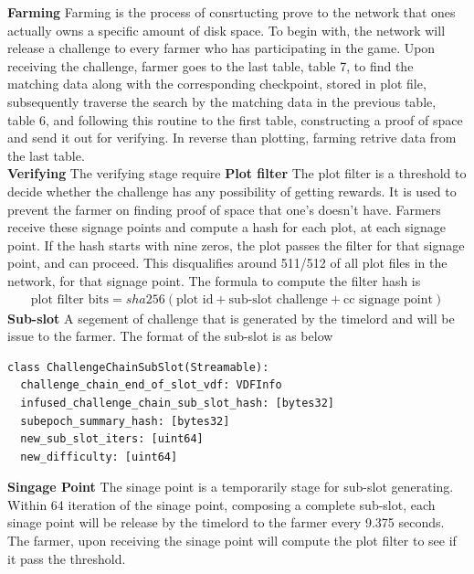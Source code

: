 \documentclass[sigconf, nonacm, natbib=false]{acmart}
\begin{document}
{\bf Farming}
Farming is the process of consrtucting prove to the network that ones actually owns a specific amount of disk space. To begin with, the network will release a challenge to every farmer who has participating in the game. Upon receiving the challenge, farmer goes to the last table, table 7, to find the matching data along with the corresponding checkpoint, stored in plot file, subsequently traverse the search by the matching data in the previous table, table 6, and following this routine to the first table, constructing a proof of space and send it out for verifying. In reverse than plotting, farming retrive data from the last table. \\
{\bf Verifying}
The verifying stage require 
{\bf Plot filter}
The plot filter is a threshold to decide whether the challenge has any possibility of getting rewards. It is used to prevent the farmer on finding proof of space that one's doesn't have. Farmers receive these signage points and compute a hash for each plot, at each signage point. If the hash starts with nine zeros, the plot passes the filter for that signage point, and can proceed. This disqualifies around 511/512 of all plot files in the network, for that signage point. The formula to compute the filter hash is
\begin{align*}
  \text{plot filter bits} = sha256(\text{plot id} + \text{sub-slot challenge} + \text{cc signage point})
\end{align*}
{\bf Sub-slot} 
A segement of challenge that is generated by the timelord and will be issue to the farmer. The format of the sub-slot is as below
\begin{verbatim}
class ChallengeChainSubSlot(Streamable):
  challenge_chain_end_of_slot_vdf: VDFInfo
  infused_challenge_chain_sub_slot_hash: [bytes32]
  subepoch_summary_hash: [bytes32]
  new_sub_slot_iters: [uint64]
  new_difficulty: [uint64] 
\end{verbatim}
{\bf Singage Point}
The sinage point is a temporarily stage for sub-slot generating. Within 64 iteration of the sinage point, composing a complete sub-slot, each sinage point will be release by the timelord to the farmer every 9.375 seconds. The farmer, upon receiving the sinage point will compute the plot filter to see if it pass the threshold.

\end{document}
